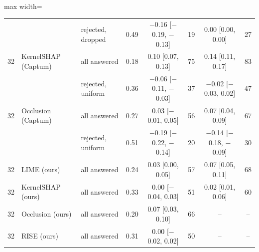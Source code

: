\begin{table}
\begin{adjustbox}{max width=\textheight}
\begin{tabular}{rllccccc}
 &  & rejected, dropped & 0.49 & $-$0.16 {[}$-$0.19, $-$0.13{]} & 19 & 0.00 {[}0.00, 0.00{]} & 27 \\
32 & KernelSHAP (Captum) & all answered & 0.18 & 0.10 {[}0.07, 0.13{]} & 75 & 0.14 {[}0.11, 0.17{]} & 83 \\
 &  & rejected, uniform & 0.36 & $-$0.06 {[}$-$0.11, $-$0.03{]} & 37 & $-$0.02 {[}$-$0.03, 0.02{]} & 47 \\
32 & Occlusion (Captum) & all answered & 0.27 & 0.03 {[}$-$0.01, 0.05{]} & 56 & 0.07 {[}0.04, 0.09{]} & 67 \\
 &  & rejected, uniform & 0.51 & $-$0.19 {[}$-$0.22, $-$0.14{]} & 20 & $-$0.14 {[}$-$0.18, $-$0.09{]} & 30 \\[2pt]
32 & LIME (ours) & all answered & 0.24 & 0.03 {[}0.00, 0.05{]} & 57 & 0.07 {[}0.05, 0.11{]} & 68 \\
32 & KernelSHAP (ours) & all answered & 0.33 & 0.00 {[}$-$0.04, 0.03{]} & 51 & 0.02 {[}0.01, 0.06{]} & 60 \\
32 & Occlusion (ours) & all answered & 0.20 & 0.07 {[}0.03, 0.10{]} & 66 & -- & -- \\
32 & RISE (ours) & all answered & 0.31 & 0.00 {[}$-$0.02, 0.02{]} & 50 & -- & -- \\
\bottomrule
\end{tabular}
\end{adjustbox}
\end{table}
